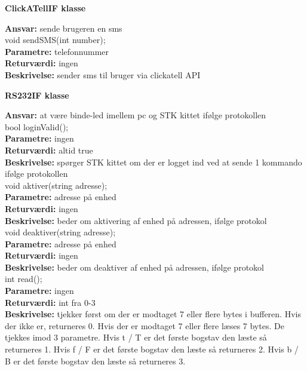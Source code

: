 \newpage

{\centering 
\textbf{ClickATellIF klasse}\par
}
\textbf{Ansvar:} sende brugeren en sms \\

void sendSMS(int number); \\
\textbf{Parametre:} telefonnummer \\
\textbf{Returværdi:} ingen \\
\textbf{Beskrivelse:} sender sms til bruger via clickatell API \\

{\centering 
\textbf{RS232IF klasse}\par
}
\textbf{Ansvar:} at være binde-led imellem pc og STK kittet ifølge protokollen \\

bool loginValid(); \\
\textbf{Parametre:} ingen \\
\textbf{Returværdi:} altid true\\
\textbf{Beskrivelse:} spørger STK kittet om der er logget ind ved at sende 1 kommando ifølge protokollen \\

void aktiver(string adresse); \\
\textbf{Parametre:} adresse på enhed \\
\textbf{Returværdi:} ingen \\
\textbf{Beskrivelse:} beder om aktivering af enhed på adressen, ifølge protokol \\

void deaktiver(string adresse); \\
\textbf{Parametre:} adresse på enhed \\
\textbf{Returværdi:} ingen \\
\textbf{Beskrivelse:} beder om deaktiver af enhed på adressen, ifølge protokol \\

int read(); \\
\textbf{Parametre:} ingen\\
\textbf{Returværdi:} int fra 0-3 \\
\textbf{Beskrivelse:} tjekker først om der er modtaget 7 eller flere bytes i bufferen. Hvis der ikke er, returneres 0. Hvis der er modtaget 7 eller flere læses 7 bytes. De tjekkes imod 3 parametre. Hvis t / T er det første bogstav den læste så returneres 1. Hvis f / F er det første bogstav den læste så returneres 2. Hvis b / B er det første bogstav den læste så returneres 3.  

